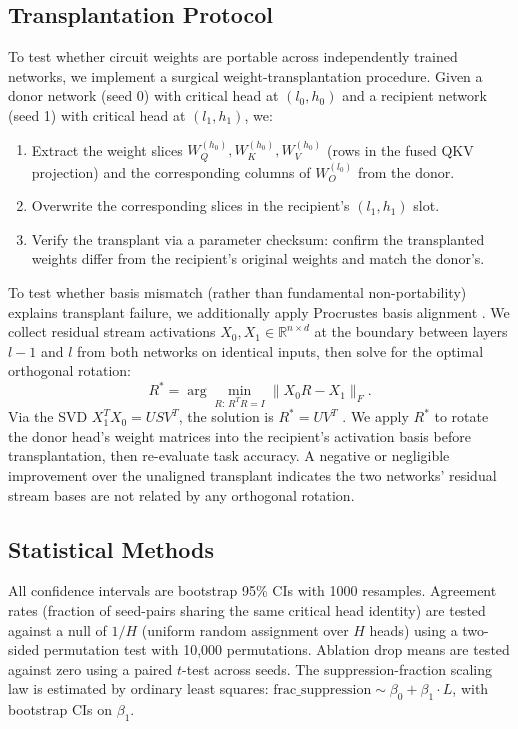 \subsection{Transplantation Protocol}
\label{sec:transplant}

To test whether circuit weights are portable across independently trained networks, we implement
a surgical weight-transplantation procedure. Given a donor network (seed 0) with critical
head at $(l_0, h_0)$ and a recipient network (seed 1) with critical head at $(l_1, h_1)$, we:
\begin{enumerate}
    \item Extract the weight slices $W_Q^{(h_0)}, W_K^{(h_0)}, W_V^{(h_0)}$ (rows in the fused
          QKV projection) and the corresponding columns of $W_O^{(l_0)}$ from the donor.
    \item Overwrite the corresponding slices in the recipient's $(l_1, h_1)$ slot.
    \item Verify the transplant via a parameter checksum: confirm the transplanted weights differ
          from the recipient's original weights and match the donor's.
\end{enumerate}

To test whether basis mismatch (rather than fundamental non-portability) explains transplant
failure, we additionally apply Procrustes basis alignment \cite{schonemann1966procrustes}.
We collect residual stream activations $X_0, X_1 \in \mathbb{R}^{n \times d}$ at the boundary
between layers $l-1$ and $l$ from both networks on identical inputs, then solve for the optimal
orthogonal rotation:
\begin{equation}
\label{eq:procrustes}
R^* = \arg\min_{R:\, R^T R = I} \|X_0 R - X_1\|_F.
\end{equation}
Via the SVD $X_1^T X_0 = U S V^T$, the solution is $R^* = U V^T$ \cite{horn1994topics}.
We apply $R^*$ to rotate the donor head's weight matrices into the recipient's activation basis
before transplantation, then re-evaluate task accuracy. A negative or negligible improvement
over the unaligned transplant indicates the two networks' residual stream bases are not related
by any orthogonal rotation.

\subsection{Statistical Methods}
\label{sec:stats}

All confidence intervals are bootstrap 95\% CIs with 1000 resamples. Agreement rates
(fraction of seed-pairs sharing the same critical head identity) are tested against a null of
$1/H$ (uniform random assignment over $H$ heads) using a two-sided permutation test with 10,000
permutations. Ablation drop means are tested against zero using a paired $t$-test across seeds.
The suppression-fraction scaling law is estimated by ordinary least squares:
$\text{frac\_suppression} \sim \beta_0 + \beta_1 \cdot L$, with bootstrap CIs on $\beta_1$.


